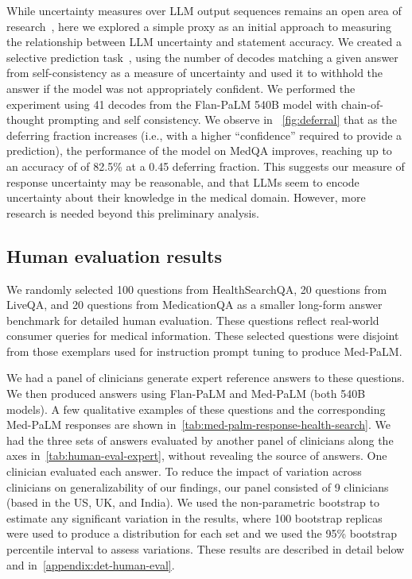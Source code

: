 While uncertainty measures over LLM output sequences remains an open area of research~\cite{kadavath2022language, lin2022teaching}, here we explored a simple proxy as an initial approach to measuring the relationship between LLM uncertainty and statement accuracy. We created a selective prediction task~\cite{tran2022plex}, using the number of decodes matching a given answer from self-consistency as a measure of uncertainty and used it to withhold the answer if the model was not appropriately confident. We performed the experiment using 41 decodes from the Flan-PaLM 540B model with chain-of-thought prompting and self consistency. We observe in ~\ref{fig:deferral} that as the deferring fraction increases (i.e., with a higher “confidence” required to provide a prediction), the performance of the model on MedQA improves, reaching up to an accuracy of of 82.5\% at a 0.45 deferring fraction. This suggests our measure of response uncertainty may be reasonable, and that LLMs seem to encode uncertainty about their knowledge in the medical domain. However, more research is needed beyond this preliminary analysis.

\subsection{Human evaluation results}
\label{sec:human_evaluation_results}

We randomly selected 100 questions from HealthSearchQA, 20 questions from LiveQA, and 20 questions from MedicationQA as a smaller long-form answer benchmark for detailed human evaluation. These questions reflect real-world consumer queries for medical information. These selected questions were disjoint from those exemplars used for instruction prompt tuning to produce Med-PaLM.

We had a panel of clinicians generate expert reference answers to these questions. We then produced answers using Flan-PaLM and Med-PaLM (both 540B models). A few qualitative examples of these questions and the corresponding Med-PaLM responses are shown in~\ref{tab:med-palm-response-health-search}. We had the three sets of answers evaluated by another panel of clinicians along the axes in~\ref{tab:human-eval-expert}, without revealing the source of answers. One clinician evaluated each answer. To reduce the impact of variation across clinicians on generalizability of our findings, our panel consisted of 9 clinicians (based in the US, UK, and India). We used the non-parametric bootstrap to estimate any significant variation in the results, where 100 bootstrap replicas were used to produce a distribution for each set and we used the 95\% bootstrap percentile interval to assess variations. These results are described in detail below and in~\ref{appendix:det-human-eval}.

